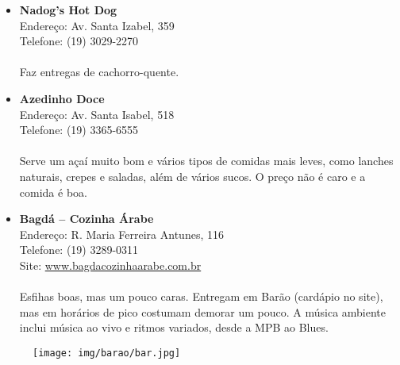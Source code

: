 \begin{itemize}
\item \textbf{Nadog's Hot Dog}
  \\Endereço: Av. Santa Izabel, 359
  \\Telefone: (19) 3029-2270
  \\
  \\Faz entregas de cachorro-quente.

\item \textbf{Azedinho Doce}
  \\Endereço: Av. Santa Isabel, 518
  \\Telefone: (19) 3365-6555
  \\
  \\Serve um açaí muito bom e vários tipos de comidas mais leves, como lanches
  naturais, crepes e saladas, além de vários sucos. O preço não é caro e a
  comida é boa.

\item \textbf{Bagdá -- Cozinha Árabe}
  \\Endereço: R. Maria Ferreira Antunes, 116
  \\Telefone: (19) 3289-0311
  \\Site: \url{www.bagdacozinhaarabe.com.br}
  \\
  \\Esfihas boas, mas um pouco caras. Entregam em Barão (cardápio no site), mas
  em horários de pico costumam demorar um pouco. A música ambiente inclui
  música ao vivo e ritmos variados, desde a MPB ao Blues.
\end{itemize}

\begin{figure}[h!]
  \centering
  \texttt{[image: img/barao/bar.jpg]}
\end{figure}

